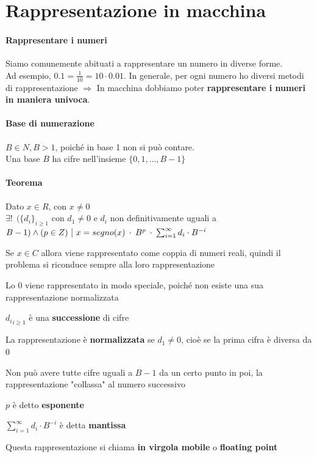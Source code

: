 \documentclass[10pt]{book}
\begin{document}
\section{Rappresentazione in macchina}
\paragraph{Rappresentare i numeri} Siamo comunemente abituati a rappresentare un numero in diverse forme.\\
Ad esempio, $0.1 = \frac{1}{10} = 10 \cdot 0.01$. In generale, per ogni numero ho diversi metodi di rappresentazione $\Rightarrow$ In macchina dobbiamo poter \textbf{rappresentare i numeri in maniera univoca}.
\paragraph{Base di numerazione} $B \in N, B > 1$, poiché in base 1 non si può contare.\\Una base $B$ ha cifre nell'insieme $\{0, 1, \ldots, B - 1\}$
\paragraph{Teorema} Dato $x \in R$, con $x \neq 0$\\$\exists!\:\:(\{d_i\}_{i \geq 1}$ con $d_1 \neq 0$ e $d_i$ non definitivamente uguali a $B - 1) \wedge (p \in Z) \:\:\vline\:\: x = segno(x)\:\cdot\:B^p\:\cdot\:\sum_{i=1}^\infty d_i \cdot B^{-i}$
\begin{list}{}{Considerazioni}
	\item Se $x \in C$ allora viene rappresentato come coppia di numeri reali, quindi il problema si riconduce sempre alla loro rappresentazione
	\item Lo $0$ viene rappresentato in modo speciale, poiché non esiste una sua rappresentazione normalizzata
	\item ${d_i}_{i \geq 1}$ è una \textbf{successione} di cifre
	\item La rappresentazione è \textbf{normalizzata} se $d_1 \neq 0$, cioè se la prima cifra è diversa da 0
	\item Non può avere tutte cifre uguali a $B-1$ da un certo punto in poi, la rappresentazione "collassa" al numero successivo
	\item $p$ è detto \textbf{esponente}
	\item $\sum_{i=1}^\infty d_i \cdot B^{-i}$ è detta \textbf{mantissa}
	\item Questa rappresentazione si chiama \textbf{in virgola mobile} o \textbf{floating point}
\end{list}
\begin{center}
\end{center} %
\pagebreak
\end{document}
